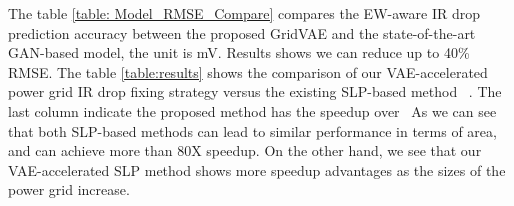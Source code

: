 \begin{table}[h]
	\begin{center} %
		\caption{ Comparison of the proposed VAE-accelerated SLP optimization method against the existing method}
		\label{table:results}
		\center
	\end{center}
	\vspace{-0.1in}
\end{table}
      The table \ref{table: Model_RMSE_Compare}  compares the EW-aware IR drop prediction accuracy between the proposed GridVAE and the state-of-the-art GAN-based model, the unit is mV. Results shows we can reduce up to 40\% RMSE. 
      The table \ref{table:results} shows the comparison of our VAE-accelerated power grid IR drop fixing strategy versus the existing SLP-based method~\cite{Sukharev:2019pg} . The last column indicate
      the proposed method has the speedup over~\cite{Sukharev:2019pg}
      As we can see that both SLP-based
      methods can lead to similar performance in terms of area,  and can achieve more than 80X speedup.  On the other hand, we see that our VAE-accelerated SLP method shows more speedup advantages as the sizes of the power grid increase.
      








